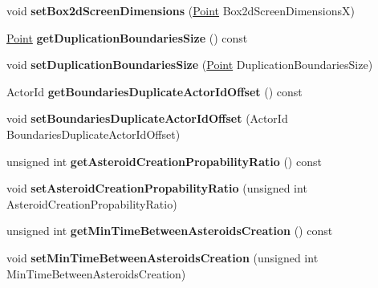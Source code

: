 \begin{DoxyCompactItemize}
\item 
void {\bfseries set\+Box2d\+Screen\+Dimensions} (\hyperlink{classPoint}{Point} Box2d\+Screen\+DimensionsX)\hypertarget{classGameConfiguration_ac7eca49d46dcc1ed7fd972bb07699a13}{}\label{classGameConfiguration_ac7eca49d46dcc1ed7fd972bb07699a13}

\item 
\hyperlink{classPoint}{Point} {\bfseries get\+Duplication\+Boundaries\+Size} () const \hypertarget{classGameConfiguration_a17f259cb926de5ded2b28f77c880dcaf}{}\label{classGameConfiguration_a17f259cb926de5ded2b28f77c880dcaf}

\item 
void {\bfseries set\+Duplication\+Boundaries\+Size} (\hyperlink{classPoint}{Point} Duplication\+Boundaries\+Size)\hypertarget{classGameConfiguration_aa41df33fff977a2950b3c001e2641684}{}\label{classGameConfiguration_aa41df33fff977a2950b3c001e2641684}

\item 
Actor\+Id {\bfseries get\+Boundaries\+Duplicate\+Actor\+Id\+Offset} () const \hypertarget{classGameConfiguration_a4360542ed9767f34262e434babc41d39}{}\label{classGameConfiguration_a4360542ed9767f34262e434babc41d39}

\item 
void {\bfseries set\+Boundaries\+Duplicate\+Actor\+Id\+Offset} (Actor\+Id Boundaries\+Duplicate\+Actor\+Id\+Offset)\hypertarget{classGameConfiguration_a781ddd1d05b3fff5e804a58095c4f51e}{}\label{classGameConfiguration_a781ddd1d05b3fff5e804a58095c4f51e}

\item 
unsigned int {\bfseries get\+Asteroid\+Creation\+Propability\+Ratio} () const \hypertarget{classGameConfiguration_a3e80e3466cc4766edd17badb0aec3cad}{}\label{classGameConfiguration_a3e80e3466cc4766edd17badb0aec3cad}

\item 
void {\bfseries set\+Asteroid\+Creation\+Propability\+Ratio} (unsigned int Asteroid\+Creation\+Propability\+Ratio)\hypertarget{classGameConfiguration_a07bc752c7071100bbf12b22a98018a0a}{}\label{classGameConfiguration_a07bc752c7071100bbf12b22a98018a0a}

\item 
unsigned int {\bfseries get\+Min\+Time\+Between\+Asteroids\+Creation} () const \hypertarget{classGameConfiguration_ab14c64e9479f5ff27dfbbbe74922b93d}{}\label{classGameConfiguration_ab14c64e9479f5ff27dfbbbe74922b93d}

\item 
void {\bfseries set\+Min\+Time\+Between\+Asteroids\+Creation} (unsigned int Min\+Time\+Between\+Asteroids\+Creation)\hypertarget{classGameConfiguration_a0ebad81e5deab674787b1c3367bd7862}{}\label{classGameConfiguration_a0ebad81e5deab674787b1c3367bd7862}


\end{DoxyCompactItemize}
